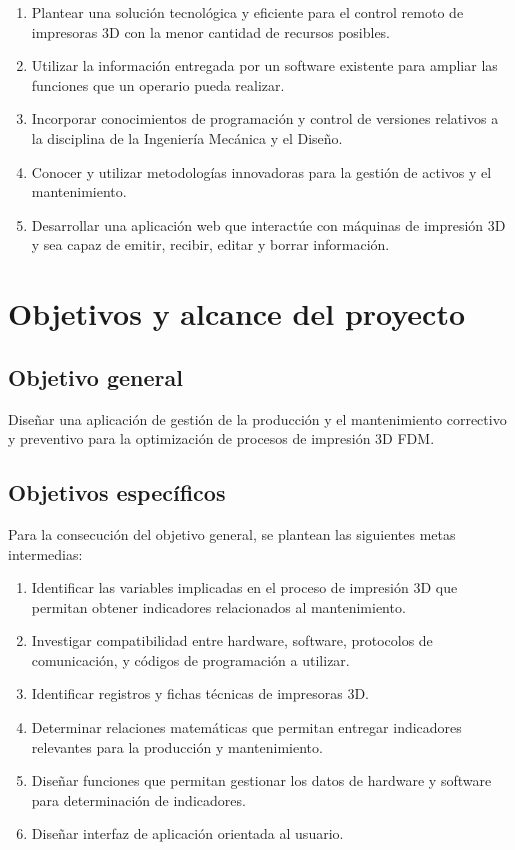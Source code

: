 \begin{enumerate}
	\item Plantear una solución tecnológica y eficiente para el control remoto de impresoras 3D con la menor cantidad de recursos posibles.
	\item Utilizar la información entregada por un software existente para ampliar las funciones que un operario pueda realizar.
	\item Incorporar conocimientos de programación y control de versiones relativos a la disciplina de la Ingeniería Mecánica y el Diseño.
	\item Conocer y utilizar metodologías innovadoras para la gestión de activos y el mantenimiento.
	\item Desarrollar una aplicación web que interactúe con máquinas de impresión 3D y sea capaz de emitir, recibir, editar y borrar información.   
\end{enumerate} 

\clearpage

\section{Objetivos y alcance del proyecto}
\label{intro:objetivos}

\subsection{Objetivo general}

Diseñar una aplicación de gestión de la producción y el mantenimiento correctivo y preventivo para la optimización de procesos de impresión 3D FDM.

\subsection{Objetivos espec\'ificos}

Para la consecución del objetivo general, se plantean las siguientes metas intermedias:

\begin{enumerate}
 
	\item Identificar las variables implicadas en el proceso de impresión 3D que permitan obtener indicadores relacionados al mantenimiento.
	\item Investigar compatibilidad entre hardware, software, protocolos de comunicación, y códigos de programación a utilizar.
	\item Identificar registros y fichas técnicas de impresoras 3D.
	\item Determinar relaciones matemáticas que permitan entregar indicadores relevantes para la producción y mantenimiento.
	\item Diseñar funciones que permitan gestionar los datos de hardware y software para determinación de indicadores.
	\item Diseñar interfaz de aplicación orientada al usuario. 
	
\end{enumerate} 
